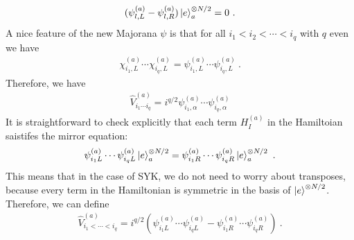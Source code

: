\documentclass{article}
\theoremstyle{definition}
\newcommand{\NL}[1]{\textcolor{blue}{#1}}
\begin{document}
    \begin{eqnarray}
        (\psi^{(a)}_{l,L}-\psi^{(a)}_{l,R})\ket{e}_a^{\otimes N/2}=0\ .
    \end{eqnarray}
    A nice feature of the new Majorana $\psi$ is that for all $i_{1}<i_{2}<\cdots
    <i_{q}$ with $q$ even we have
    \begin{eqnarray}
        \chi^{(a)}_{i_1,L}\cdots \chi^{(a)}_{i_q,L}=\psi^{(a)}_{i_1,L}\cdots \psi^{(a)}_{i_q,L}\ .
    \end{eqnarray}
    Therefore, we have
    \begin{eqnarray}
        \hat{V}^{(a)}_{i_1\cdots i_q}=i^{q/2}\psi^{(a)}_{i_1,\alpha}\cdots \psi^{(a)}_{i_q,\alpha}
    \end{eqnarray}
    It is straightforward to check explicitly that each term $H^{(a)}_{I}$ in
    the Hamiltoian saistifes the mirror equation:
    \begin{eqnarray}
        \psi^{(a)}_{i_1L}\cdots \psi^{(a)}_{i_qL}\ket{e}_a^{\otimes N/2}= \psi^{(a)}_{i_1R}\cdots
        \psi^{(a)}_{i_qR}\ket{e}_a^{\otimes N/2}\ .
    \end{eqnarray}
    This means that in the case of SYK, we do not need to worry about transposes,
    because every term in the Hamiltonian is symmetric in the basis of $\ket{e}^{\otimes
    N/2}$. Therefore, we can define
    \begin{eqnarray}
        \label{VSYK} \hat{V}^{(a)}_{i_1<\cdots <i_q}= i^{q/2}(\psi^{(a)}_{i_1L}\cdots
        \psi^{(a)}_{i_qL}- \psi^{(a)}_{i_1R}\cdots \psi^{(a)}_{i_qR})\ .
    \end{eqnarray}

\end{document}
